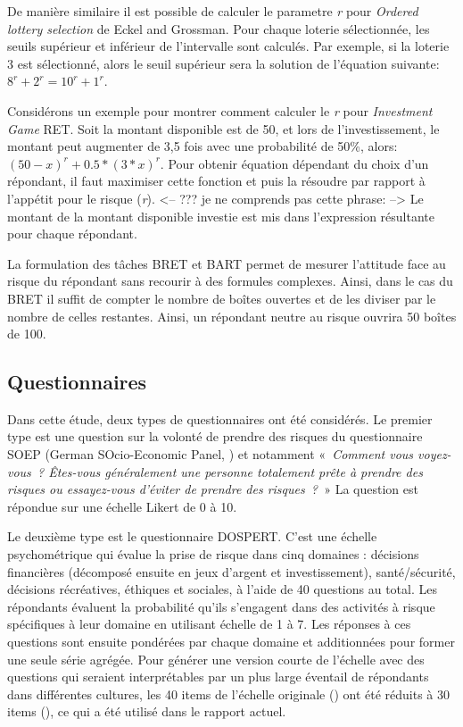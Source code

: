 \documentclass[12pt]{article}
\begin{document}
De manière similaire il est possible de calculer le parametre \emph{r}
pour \emph{Ordered lottery selection} de Eckel and Grossman. Pour chaque
loterie sélectionnée, les seuils supérieur et inférieur de l'intervalle
sont calculés. Par exemple, si la loterie 3 est sélectionné, alors le
seuil supérieur sera la solution de l'équation suivante:
\(8^r + 2^r = 10^r + 1^r\).

Considérons un exemple pour montrer comment calculer le \emph{r} pour
\emph{Investment Game} RET. Soit la montant disponible est de 50, et
lors de l'investissement, le montant peut augmenter de 3,5 fois avec une
probabilité de 50\%, alors: \((50 - x)^r + 0.5 * (3 * x)^r\). Pour
obtenir équation dépendant du choix d'un répondant, il faut maximiser
cette fonction et puis la résoudre par rapport à l'appétit pour le
risque (\emph{r}). \textless-- ??? je ne comprends pas cette phrase:
--\textgreater{} Le montant de la montant disponible investie est mis
dans l'expression résultante pour chaque répondant.

La formulation des tâches BRET et BART permet de mesurer l'attitude face
au risque du répondant sans recourir à des formules complexes. Ainsi,
dans le cas du BRET il suffit de compter le nombre de boîtes ouvertes et
de les diviser par le nombre de celles restantes. Ainsi, un répondant
neutre au risque ouvrira 50 boîtes de 100.

\subsection{Questionnaires}

Dans cette étude, deux types de questionnaires ont été considérés. Le
premier type est une question sur la volonté de prendre des risques du
questionnaire SOEP (German SOcio-Economic Panel, \citet{SOEP2007}) et
notamment «~\emph{Comment vous voyez-vous~? Êtes-vous généralement une
personne totalement prête à prendre des risques ou essayez-vous d'éviter
de prendre des risques~?~}» La question est répondue sur une échelle
Likert de 0 à 10.

Le deuxième type est le questionnaire DOSPERT. C'est une échelle
psychométrique qui évalue la prise de risque dans cinq domaines :
décisions financières (décomposé ensuite en jeux d'argent et
investissement), santé/sécurité, décisions récréatives, éthiques et
sociales, à l'aide de 40 questions au total. Les répondants évaluent la
probabilité qu'ils s'engagent dans des activités à risque spécifiques à
leur domaine en utilisant échelle de 1 à 7. Les réponses à ces questions
sont ensuite pondérées par chaque domaine et additionnées pour former
une seule série agrégée. Pour générer une version courte de l'échelle
avec des questions qui seraient interprétables par un plus large
éventail de répondants dans différentes cultures, les 40 items de
l'échelle originale (\citet{Weber2002}) ont été réduits à 30 items
(\citet{Blais2006}), ce qui a été utilisé dans le rapport actuel.
\end{document}
